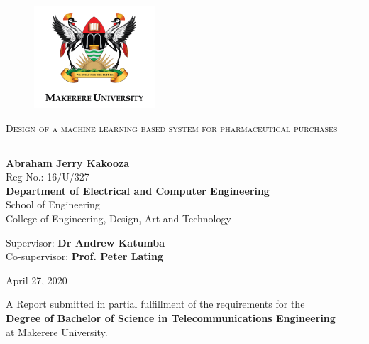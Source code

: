 \documentclass[12pt]{report}
\begin{document}
\begin{titlepage}
\centering

\begin{figure}[H]
\centering
\includegraphics[width=0.4\textwidth]{MAK_Logo2_png.png}%
\end{figure}


\textsc{}


{\huge \textsc{Design of a machine learning based system for pharmaceutical purchases}  \\}
\rule{3in}{0.4pt}


{\Large\textbf{Abraham Jerry Kakooza}	 \\}
Reg No.: 16/U/327\\ \vspace{2cm}
{\large \textbf{Department of Electrical and Computer Engineering} \\
School of Engineering \\
College of Engineering, Design, Art and Technology}




{
Supervisor: \textbf{Dr Andrew Katumba}    \\
Co-supervisor: \textbf{Prof. Peter Lating} }


April 27, 2020


{
A Report submitted in partial fulfillment of the requirements for the \\ \textbf{ Degree of Bachelor of Science in Telecommunications Engineering} \\ at Makerere University. }


\end{titlepage}
\end{document}

